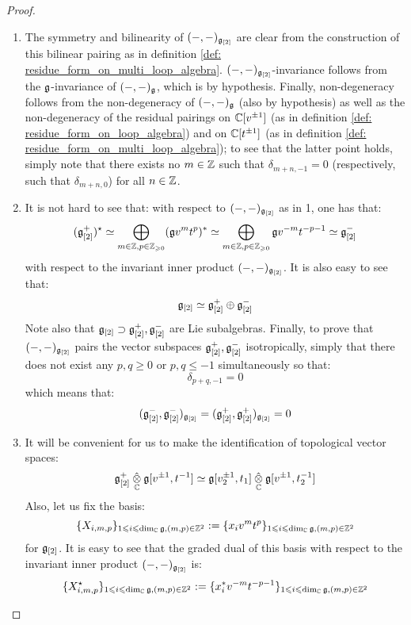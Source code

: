             \begin{proof}
                \begin{enumerate}
                    \item The symmetry and bilinearity of $(-, -)_{\mathfrak{g}_{[2]}}$ are clear from the construction of this bilinear pairing as in definition \ref{def: residue_form_on_multi_loop_algebra}. $(-, -)_{\mathfrak{g}_{[2]}}$-invariance follows from the $\mathfrak{g}$-invariance of $(-, -)_{\mathfrak{g}}$, which is by hypothesis. Finally, non-degeneracy follows from the non-degeneracy of $(-, -)_{\mathfrak{g}}$ (also by hypothesis) as well as the non-degeneracy of the residual pairings on $\mathbb{C}[v^{\pm 1}]$ (as in definition \ref{def: residue_form_on_loop_algebra}) and on $\mathbb{C}[t^{\pm 1}]$ (as in definition \ref{def: residue_form_on_multi_loop_algebra}); to see that the latter point holds, simply note that there exists no $m \in \mathbb{Z}$ such that $\delta_{m + n, - 1} = 0$ (respectively, such that $\delta_{m + n, 0}$) for all $n \in \mathbb{Z}$.
                    \item It is not hard to see that: with respect to $(-, -)_{\mathfrak{g}_{[2]}}$ as in 1, one has that:
                        $$(\mathfrak{g}_{[2]}^+)^{\star} \simeq \bigoplus_{m \in \mathbb{Z}, p \in \mathbb{Z}_{\geqslant 0}} (\mathfrak{g} v^m t^p)^* \simeq \bigoplus_{m \in \mathbb{Z}, p \in \mathbb{Z}_{\geqslant 0}} \mathfrak{g} v^{-m} t^{-p - 1} \simeq \mathfrak{g}_{[2]}^-$$
                    with respect to the invariant inner product $(-, -)_{\mathfrak{g}_{[2]}}$. It is also easy to see that:
                        $$\mathfrak{g}_{[2]} \simeq \mathfrak{g}_{[2]}^+ \oplus \mathfrak{g}_{[2]}^-$$
                    Note also that $\mathfrak{g}_{[2]} \supset \mathfrak{g}_{[2]}^+, \mathfrak{g}_{[2]}^-$ are Lie subalgebras. Finally, to prove that $(-, -)_{\mathfrak{g}_{[2]}}$ pairs the vector subspaces $\mathfrak{g}_{[2]}^+, \mathfrak{g}_{[2]}^-$ isotropically, simply that there does not exist any $p, q \geq 0$ or $p, q \leq -1$ simultaneously so that:
                        $$\delta_{p + q, -1} = 0$$
                    which means that:
                        $$(\mathfrak{g}_{[2]}^-, \mathfrak{g}_{[2]}^-)_{\mathfrak{g}_{[2]}} = (\mathfrak{g}_{[2]}^+, \mathfrak{g}_{[2]}^+)_{\mathfrak{g}_{[2]}} = 0$$
                    \item It will be convenient for us to make the identification of topological vector spaces:
                        $$\g_{[2]}^+ \hattensor_{\bbC} \g[v^{\pm 1}, t^{-1}] \cong \g[v_2^{\pm 1}, t_1] \hattensor_{\bbC} \g[v^{\pm 1}, t_2^{-1}]$$
                    Also, let us fix the basis:
                        $$\{X_{i, m, p}\}_{1 \leqslant i \leqslant \dim_{\mathbb{C}} \mathfrak{g}, (m, p) \in \mathbb{Z}^2} := \{x_i v^m t^p\}_{1 \leqslant i \leqslant \dim_{\mathbb{C}} \mathfrak{g}, (m, p) \in \mathbb{Z}^2}$$
                    for $\mathfrak{g}_{[2]}$. It is easy to see that the graded dual of this basis with respect to the invariant inner product $(-, -)_{\mathfrak{g}_{[2]}}$ is:
                        $$\{X_{i, m, p}^{\star}\}_{1 \leqslant i \leqslant \dim_{\mathbb{C}} \mathfrak{g}, (m, p) \in \mathbb{Z}^2} := \{x_i^* v^{-m} t^{-p - 1}\}_{1 \leqslant i \leqslant \dim_{\mathbb{C}} \mathfrak{g}, (m, p) \in \mathbb{Z}^2}$$
                    

\end{enumerate}
\end{proof}
